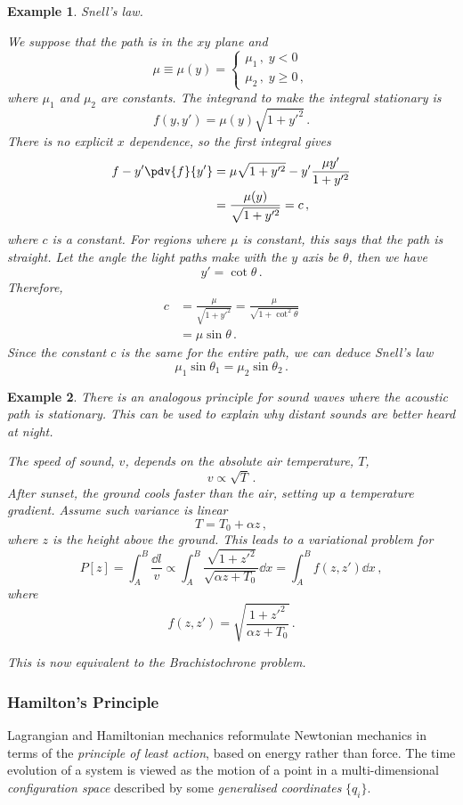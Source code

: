 \documentclass{article}
\theoremstyle{plain}\theoremheaderfont{\normalfont\itshape}\theorembodyfont{\rmfamily}\theoremseparator{.}\newtheorem*{rem}{Remark}\newtheorem*{ex}{Example}\newtheorem*{proof}{Proof}\newtheorem*{altp}{Alternative proof}
\theoremstyle{plain}\theoremheaderfont{\normalfont\bfseries}\theorembodyfont{\rmfamily}\theoremseparator{.}\newtheorem{thm}{Theorem}[section]\newtheorem{lem}[thm]{Lemma}\newtheorem{prop}[thm]{Proposition}\newtheorem*{cor}{Corollary}\newtheorem{defn}[thm]{Definition}\newtheorem{clm}[thm]{Claim}\newtheorem{clminproof}{Claim}
\theoremstyle{break}\theoremheaderfont{\normalfont\itshape}\theorembodyfont{\rmfamily}\theoremseparator{.\medskip}\newtheorem*{proofskip}{Proof}\newtheorem*{exs}{Examples}\newtheorem*{rems}{Remarks}
\theoremstyle{break}\theoremheaderfont{\normalfont\bfseries}\theorembodyfont{\rmfamily}\theoremseparator{.\medskip}\newtheorem{lemskip}[thm]{Lemma}\newtheorem{defnskip}[thm]{Definition}\newtheorem{propskip}[thm]{Proposition}\newtheorem{thmskip}[thm]{Theorem}
\numberwithin{equation}{section}
\begin{document}
	\begin{ex}
		\textit{Snell's law.}
		
		We suppose that the path is in the \(xy\) plane and
		\[\mu\equiv\mu(y)=\begin{cases}
			\mu_1\,,\;y<0\\
			\mu_2\,,\;y\ge 0\,,
		\end{cases}\]
		where \(\mu_1\) and \(\mu_2\) are constants. The integrand to make the integral stationary is
		\[f(y,y')=\mu(y)\sqrt{1+y'^2}\,.\]
		There is no explicit \(x\) dependence, so the first integral gives
		\begin{align*}
			f-y'\pdv{f}{y'}&=\mu\sqrt{1+y'^2}-y'\frac{\mu y'}{1+y'^2}\\
			&=\frac{\mu(y)}{\sqrt{1+y'^2}}=c\,,
		\end{align*}
		where \(c\) is a constant. For regions where \(\mu\) is constant, this says that the path is straight. Let the angle the light paths make with the \(y\) axis be \(\theta\), then we have
		\[y'=\cot\theta\,.\]
		Therefore,
		\begin{align*}
			c&=\frac{\mu}{\sqrt{1+y'^2}}=\frac{\mu}{\sqrt{1+\cot^2\!\theta}}\\
			&=\mu\sin\theta\,.
		\end{align*}
		Since the constant \(c\) is the same for the entire path, we can deduce Snell's law
		\[\mu_1\sin\theta_1=\mu_2\sin\theta_2\,.\]
	\end{ex}
	\begin{ex}
		There is an analogous principle for sound waves where the acoustic path is stationary. This can be used to explain why distant sounds are better heard at night.
		
		The speed of sound, \(v\), depends on the absolute air temperature, \(T\),
		\[v\propto\sqrt{T}\,.\]
		After sunset, the ground cools faster than the air, setting up a temperature gradient. Assume such variance is linear
		\[T=T_0+\alpha z\,,\]
		where \(z\) is the height above the ground. This leads to a variational problem for
		\[P[z]=\int_{A}^{B}\frac{\dd{l}}{v}\propto\int_{A}^{B}\frac{\sqrt{1+z'^2}}{\sqrt{\alpha z+T_0}}\dd{x}=\int_{A}^{B}f(z,z')\dd{x}\,,\]
		where
		\[f(z,z')=\sqrt{\frac{1+z'^2}{\alpha z+T_0}}\,.\]

		This is now equivalent to the Brachistochrone problem.
	\end{ex}
	\subsubsection{Hamilton's Principle}
	Lagrangian and Hamiltonian mechanics reformulate Newtonian mechanics in terms of the \textit{principle of least action}, based on energy rather than force. The time evolution of a system is viewed as the motion of a point in a multi-dimensional \textit{configuration space} described by some \textit{generalised coordinates} \(\{q_i\}\).
\end{document}
